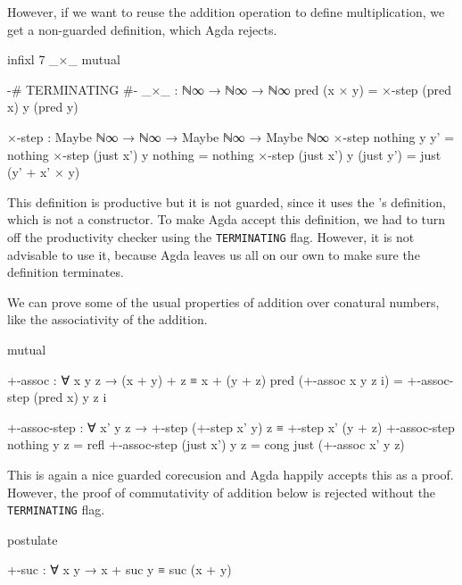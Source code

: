 However, if we want to reuse the addition operation to define multiplication, we get a non-guarded definition, which Agda rejects.

\begin{code}[hide]
infixl 7 _×_
mutual
\end{code}
\begin{code}
  {-# TERMINATING #-}
  _×_ : ℕ∞ → ℕ∞ → ℕ∞
  pred (x × y) = ×-step (pred x) y (pred y)

  ×-step :
    Maybe ℕ∞ → ℕ∞ → Maybe ℕ∞ → Maybe ℕ∞
  ×-step nothing    y y'         = nothing
  ×-step (just x')  y nothing    = nothing
  ×-step (just x')  y (just y')  = just (y' + x' × y)
\end{code}

This definition is productive but it is not guarded, since it uses the \AgdaFunction{_+_}'s definition, which is not a constructor. To make Agda accept this definition, we had to turn off the productivity checker using the \texttt{TERMINATING} flag. However, it is not advisable to use it, because Agda leaves us all on our own to make sure the definition terminates.

We can prove some of the usual properties of addition over conatural numbers, like the associativity of the addition.

\begin{code}[hide]
mutual
\end{code}
\begin{code}
  +-assoc : ∀ x y z → (x + y) + z ≡ x + (y + z)
  pred (+-assoc x y z i) = +-assoc-step (pred x) y z i

  +-assoc-step :
    ∀ x' y z →
    +-step (+-step x' y) z ≡ +-step x' (y + z)
  +-assoc-step nothing    y z = refl
  +-assoc-step (just x')  y z = cong just (+-assoc x' y z)
\end{code}

This is again a nice guarded corecusion and Agda happily accepts this as a proof. However, the proof of commutativity of addition below is rejected without the \texttt{TERMINATING} flag.

\begin{code}[hide]
postulate
\end{code}
\begin{code}
  +-suc : ∀ x y → x + suc y ≡ suc (x + y)
\end{code}


